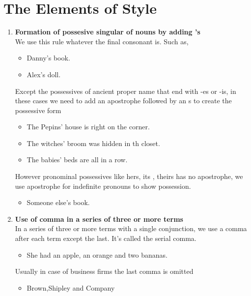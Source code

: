 \documentclass{report}
\begin{document}
\chapter{\color{blue}The Elements of Style}
\label{chap2}
\begin{enumerate}
\item \textbf{Formation of possesive singular of nouns by adding 's}\\
We use this rule whatever the final consonant is. Such as,
\begin{itemize}
\item Danny's book.
\item Alex's doll.
\end{itemize}

Except the possessives of ancient proper name that end with -es or -is, in these cases we need to add an apostrophe followed by an s to create the possessive form
\begin{itemize}
\item The Pepins' house is right on the corner.
\item The witches' broom was hidden in th closet.
\item The babies' beds are all in a row.
\end{itemize}

However pronominal possessives like hers, its , theirs has no apostrophe, we use apostrophe for indefinite pronouns to show possession.
\begin{itemize}
	\item Someone else's book.
\end{itemize}

\item \textbf{Use of comma in a series of three or more terms}\\
In a series of three or more terms with a single conjunction, we use a comma after each term except the last. It's called the serial comma.
\begin{itemize}
	\item She had an apple, an orange and two bananas.
\end{itemize}
Usually in case of business firms the last comma is omitted  
\begin{itemize}
	\item Brown,Shipley and Company
\end{itemize}


\end{enumerate}
\end{document}
